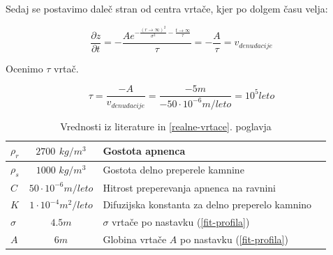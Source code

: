 \documentclass[a4paper, oneside, 12pt]{book}
\begin{document}
\newpage

        Sedaj se postavimo daleč stran od centra vrtače, kjer po dolgem času velja:

        \begin{equation}
          \frac{\partial z}{\partial t} = -\frac{A e^{-\frac{(r \rightarrow \infty)^2}{\sigma ^2}-\frac{t \rightarrow \infty}{\tau }}}{\tau } = -\frac{A}{\tau} = v_{denudacije}
          \label{hitrost-denudacije}
        \end{equation}

        Ocenimo $\tau$ vrtač.

        \begin{equation}
          \tau = \frac{-A}{v_{denudacije}}=\frac{-5m}{-50\cdot 10^{-6} m/leto} = 10^5 leto
          \label{tau-vrtace}
        \end{equation}

        \begin{table}[H]
          \centering
          \begin{tabular}{| l | c | l | l |} \hline
            $\rho_r$ & $2700$ $kg/m^3$ & Gostota apnenca                                            \\ \hline
            $\rho_s$ & $1000$ $kg/m^3$ & Gostota delno preperele kamnine                            \\ \hline
            $C$      & $50 \cdot 10^{-6} m/leto$  & Hitrost preperevanja apnenca na ravnini         \\ \hline
            $K$      & $1 \cdot 10^{-4} m^2/leto$ & Difuzijska konstanta za delno preperelo kamnino \\ \hline
            $\sigma$ & $4.5m$ & $\sigma$ vrtače po nastavku (\ref{fit-profila})                     \\ \hline
            $A$      & $6m$ & Globina vrtače $A$ po nastavku (\ref{fit-profila})                    \\ \hline
          \end{tabular}
          \caption{Vrednosti iz literature \cite{Gams1967} \cite{ford2007karst} \cite{fleurant2008modelling} in \ref{realne-vrtace}. poglavja}
          \label{tab:tabela-konstant}
        \end{table}
\end{document}
